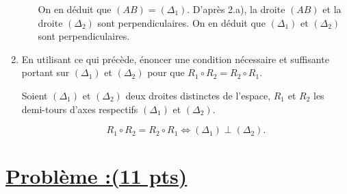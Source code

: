 \documentclass[12pt,a4paper]{article}
\begin{document}
\begin{enumerate}
\begin{enumerate}
			On en déduit que $(AB) = (\Delta_1)$. D’après 2.a), la droite $(AB)$ et la droite $(\Delta_2)$ sont perpendiculaires. On en déduit que $(\Delta_1)$ et $(\Delta_2)$ sont perpendiculaires.
		\end{enumerate}
\item En utilisant ce qui précède, énoncer une condition nécessaire et suffisante portant sur $(\Delta_1)$ et $(\Delta_2)$ pour que $R_1 \circ R_2 = R_2 \circ R_1$.

Soient $(\Delta_1)$ et $(\Delta_2)$ deux droites distinctes de l’espace, $R_1$ et $R_2$ les demi-tours d’axes respectifs $(\Delta_1)$ et $(\Delta_2)$.

\[ R_1 \circ R_2 = R_2 \circ R_1 \iff (\Delta_1) \perp (\Delta_2). \]
\end{enumerate}

\section*{\underline{Problème :(11 pts)}}
\end{document}
